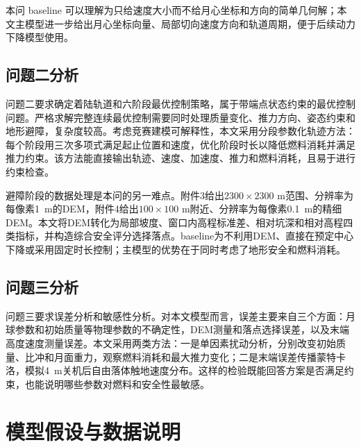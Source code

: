 \documentclass[UTF8,a4paper,12pt]{ctexart}
\begin{document}
本问 baseline 可以理解为只给速度大小而不给月心坐标和方向的简单几何解；本文主模型进一步给出月心坐标向量、局部切向速度方向和轨道周期，便于后续动力下降模型使用。

\subsection{问题二分析}
问题二要求确定着陆轨道和六阶段最优控制策略，属于带端点状态约束的最优控制问题。严格求解完整连续最优控制需要同时处理质量变化、推力方向、姿态约束和地形避障，复杂度较高。考虑竞赛建模可解释性，本文采用分段参数化轨迹方法：每个阶段用三次多项式满足起止位置和速度，优化阶段时长以降低燃料消耗并满足推力约束。该方法能直接输出轨迹、速度、加速度、推力和燃料消耗，且易于进行约束检查。

避障阶段的数据处理是本问的另一难点。附件3给出$2300\times2300$ m范围、分辨率为每像素\SI{1}{m}的DEM，附件4给出$100\times100$ m附近、分辨率为每像素\SI{0.1}{m}的精细DEM。本文将DEM转化为局部坡度、窗口内高程标准差、相对坑深和相对高程四类指标，并构造综合安全评分选择落点。baseline为不利用DEM、直接在预定中心下降或采用固定时长控制；主模型的优势在于同时考虑了地形安全和燃料消耗。

\subsection{问题三分析}
问题三要求误差分析和敏感性分析。对本文模型而言，误差主要来自三个方面：月球参数和初始质量等物理参数的不确定性，DEM测量和落点选择误差，以及末端高度速度测量误差。本文采用两类方法：一是单因素扰动分析，分别改变初始质量、比冲和月面重力，观察燃料消耗和最大推力变化；二是末端误差传播蒙特卡洛，模拟\SI{4}{m}关机后自由落体触地速度分布。这样的检验既能回答方案是否满足约束，也能说明哪些参数对燃料和安全性最敏感。

\section{模型假设与数据说明}
\end{document}
